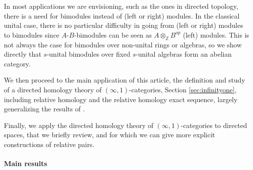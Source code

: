 \documentclass[a4paper,fleqn]{cas-sc}
\def\Z{\mathbb{Z}}
\begin{document}
In most applications we are envisioning, such as the ones in directed topology, there is a need for %
bimodules instead of (left or right) modules. In the classical unital case, there is no particular difficulty in going from (left or right) modules to bimodules since $A$-$B$-bimodules can be seen as $A{\otimes}_\Z B^{op}$ (left) modules. %
This is not always the case for bimodules over non-unital rings or algebras, so we show directly that $s$-unital bimodules over fixed $s$-unital algebras form an abelian category. %

We then proceed to the main application of this article, the definition and study of a directed homology theory of $(\infty,1)$-categories, Section \ref{sec:infinityone}, including relative homology and the relative homology exact sequence, largely generalizing the results of \cite{eric}. 

Finally, we apply the directed homology theory of $(\infty,1)$-categories to directed spaces, that we briefly review, and for which we can give more explicit constructions of relative pairs. 


\paragraph{Main results}
\end{document}
